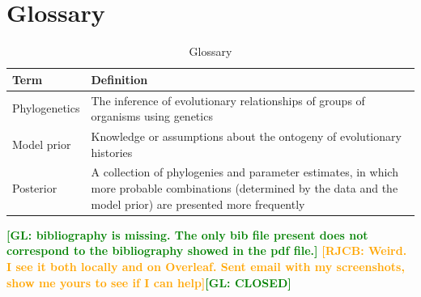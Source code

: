 \documentclass{article}
\newcommand*\richel[1]{\textcolor{orange}{\textbf{[RJCB: #1]}}}
\newcommand*\gio[1]{\textcolor{green}{\textbf{[GL: #1]}}}
\begin{document}
\section{Glossary}
\begin{table}
  \centering 
  \begin{tabular}{l p{}}
    \hline
    Term                  & Definition \\
    \hline
    \hline
    Phylogenetics         & The inference of evolutionary relationships of groups of organisms using genetics \\
    Model prior           & Knowledge or assumptions about the ontogeny of evolutionary histories \\
    Posterior             & A collection of phylogenies and parameter estimates, in which more probable combinations (determined by the data and the model prior) are presented more frequently \\
    \hline
  \end{tabular}
  \caption{
    Glossary
  }
  \label{table:glossary}
\end{table}

\gio{bibliography is missing. The only bib file present does not correspond to the bibliography showed in the pdf file.}
\richel{Weird. I see it both locally and on Overleaf. Sent email with my screenshots, show me yours to see if I can help}\gio{CLOSED}



\appendix
\end{document}
